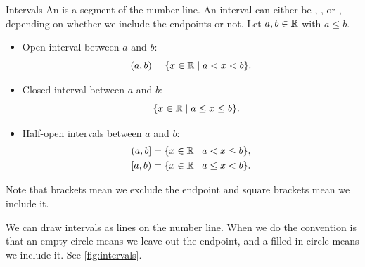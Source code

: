 \documentclass[fleqn]{LectureClass/LectureClass}
\begin{document}
    \begin{dfn}{Intervals}{}
        An  is a segment of the number line.
        An interval can either be , , or , depending on whether we include the endpoints or not.
        Let \(a, b \in \mathbb{R}\) with \(a \le b\).
        \begin{itemize}
            \item Open interval between \(a\) and \(b\):
            \begin{equation}
                (a, b) = \{x \in \mathbb{R} \mid a < x < b\}.
            \end{equation}
            \item Closed interval between \(a\) and \(b\):
            \begin{equation}
                [a, b] = \{x \in \reals \mid a \le x \le b\}.
            \end{equation}
            \item Half-open intervals between \(a\) and \(b\):
            \begin{align}
                (a, b] &= \{x \in \mathbb{R} \mid a < x \le b\},\\
                [a, b) &= \{x \in \mathbb{R} \mid a \le x < b\}.
            \end{align}
        \end{itemize}
        Note that brackets mean we exclude the endpoint and square brackets mean we include it.
    \end{dfn}
    
    We can draw intervals as lines on the number line.
    When we do the convention is that an empty circle means we leave out the endpoint, and a filled in circle means we include it.
    See \cref{fig:intervals}.
    
\end{document}

